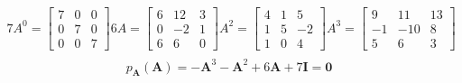 \documentclass[10pt]{article}
\begin{document}
\begin{equation} 
\begin{aligned}
    7A^{0} = 
    \begin{bmatrix}
    7 & 0 & 0\\
    0 & 7 & 0\\
    0 & 0 & 7 
    \end{bmatrix}
    6A = 
    \begin{bmatrix}
    6 & 12 & 3\\
    0 & -2 & 1\\
    6 & 6  & 0
    \end{bmatrix}  
    A^{2} = 
    \begin{bmatrix}
    4 & 1  & 5\\
    1 & 5 & -2\\
    1 & 0  & 4 
    \end{bmatrix}  
    A^{3} = 
    \begin{bmatrix}
    9 & 11  & 13\\
    -1 & -10 & 8\\
    5 & 6  & 3 
    \end{bmatrix} \nonumber \\
\end{aligned}
\end{equation}
    \[ p_{\mathbf{A}}(\mathbf{A}) = - \mathbf{A}^{3} - \mathbf{A}^{2} + 6\mathbf{A} + 7\mathbf{I} = \mathbf{0} \]
\end{document}

